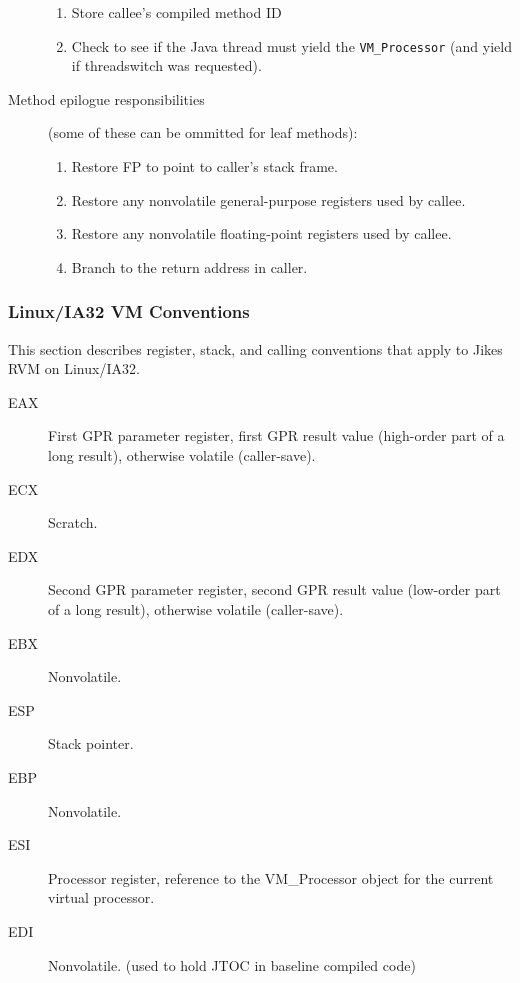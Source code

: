 \begin{description}
\begin{enumerate}
\item Store callee's compiled method ID 

\item Check to see if the Java\TMweb{} thread must yield the {\tt VM\_Processor}
(and yield if threadswitch was requested). 
\end{enumerate}

\item[Method epilogue responsibilities] (some of these can be
ommitted for leaf methods):

\begin{enumerate}
\item Restore FP to point to caller's stack frame.

\item Restore any nonvolatile general-purpose registers used by callee.

\item Restore any nonvolatile floating-point registers used by callee.

\item Branch to the return address in caller.
\end{enumerate}
\end{description}

\subsubsection{Linux/IA32 VM Conventions} \label{lintel-conventions}

This section describes register, stack, and calling conventions that
apply to Jikes RVM on Linux\Rweb{}/IA32.  


\begin{description}
\item[EAX]
    First GPR parameter register, first GPR result value (high-order part
    of a long result), otherwise volatile (caller-save).

\item[ECX]
    Scratch.

\item[EDX]
    Second GPR parameter register, second GPR result value (low-order part
    of a long result), otherwise volatile (caller-save).

\item[EBX]
    Nonvolatile.

\item[ESP]
    Stack pointer.

\item[EBP]
    Nonvolatile.

\item[ESI]
    Processor register, reference to the VM\_Processor object for the current
    virtual processor.

\item[EDI]
    Nonvolatile.  (used to hold JTOC in baseline compiled code)

\end{description}


